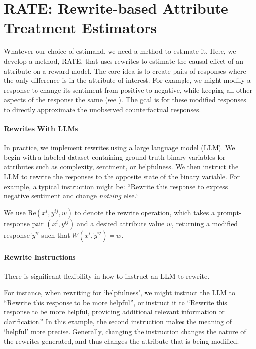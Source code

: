 \documentclass{article}
\begin{document}
\section{RATE: Rewrite-based Attribute Treatment Estimators} 
\label{sec:rate}

Whatever our choice of estimand, we need a method to estimate it. Here, we develop a method, RATE, that uses rewrites to estimate the causal effect of an attribute on a reward model. The core idea is to create pairs of responses where the only difference is in the attribute of interest. For example, we might modify a response to change its sentiment from positive to negative, while keeping all other aspects of the response the same (see ). The goal is for these modified responses to directly approximate the unobserved counterfactual responses.

\paragraph{Rewrites With LLMs}

In practice, we implement rewrites using a large language model (LLM). We begin with a labeled dataset containing ground truth binary variables for attributes such as complexity, sentiment, or helpfulness. We then instruct the LLM to rewrite the responses to the opposite state of the binary variable. For example, a typical instruction might be: ``Rewrite this response to express negative sentiment and change \emph{nothing} else.''

We use $\text{Re}(x^i, y^{ij}, w)$ to denote the rewrite operation, which takes a prompt-response pair $(x^i, y^{ij})$ and a desired attribute value $w$, returning a modified response $\tilde{y}^{ij}$ such that $W(x^i, \tilde{y}^{ij}) = w$.

\paragraph{Rewrite Instructions}
There is significant flexibility in how to instruct an LLM to rewrite.

For instance, when rewriting for `helpfulness', we might instruct the LLM to ``Rewrite this response to be more helpful'', or instruct it to ``Rewrite this response to be more helpful, providing additional relevant information or clarification.''
In this example, the second instruction makes the meaning of `helpful' more precise. Generally, changing the instruction changes the nature of the rewrites generated, and thus changes the attribute that is being modified.
\end{document}
